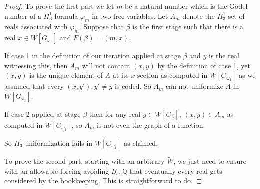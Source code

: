 \documentclass[a4paper,11pt]{article}
\newcommand{\forceQ}{\mathbb{Q}}
\begin{document}
\begin{proof}
    To prove the first part we let $m$ be a natural number which is the G\"odel number of a $\Pi^1_3$-formula $\varphi_m$ in two free variables. Let $A_m$ denote the $\Pi^1_3$ set of reals associated with $\varphi_m$. Suppose that $\beta$ is the first stage such that there is a real $x \in W[G_{\omega_1}]$ and $F(\beta) = (m, 
    \dot{x})$. 

    If case 1 in the definition of our iteration applied at stage $\beta$ and $y$ is the real witnessing this, then $A_m$ will not contain $(x,y)$ by the definition of case 1, yet $(x,y)$ is the unique element of $A$ at its $x$-section as computed in $W[G_{\omega_1}]$ as we assumed that every $(x,y'),y' \ne y$  is coded. So $A_m$ can not uniformize $A$ in $W[G_{\omega_1}]$.

    If case 2 applied at stage $\beta$ then for any real $y \in W[G_{\beta}]$, $(x,y) \in A_m$ as computed in $W[G_{\omega_1}]$, so $A_m$ is not even the graph of a function. 

    So $\Pi^1_3$-uniformization fails in $W[G_{\omega_1}]$ as claimed.

    To prove the second part, starting with an arbitrary $\tilde{W}$, we just need to ensure with an allowable forcing avoiding $B_{\omega}$ $\forceQ$ that eventually every real gets considered by the bookkeeping. This is straightforward to do.
\end{proof}



    
\end{document}
